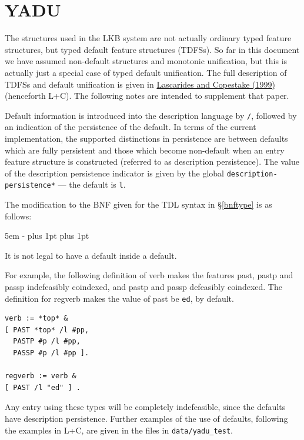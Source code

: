 \documentclass[12pt]{report}
\newcommand{\filename}[1]{{\tt #1}}
\newcommand{\lkbparam}[1]{{\tt #1}}
\begin{document}
\section{YADU}
\label{defaults}

The structures used in the LKB system are not actually 
ordinary typed feature structures, but typed default feature
structures (TDFSs).  So far in this document we have assumed
non-default structures and monotonic unification, but this is actually
just a special case of typed default unification.
The full description of TDFSs and
default unification is
given in 
\href{http://www-csli.stanford.edu/~aac/papers/yadu5-0.ps.gz}{Lascarides and
Copestake (1999)} (henceforth L+C).
The following notes are intended to supplement that paper.

Default information is introduced into the description
language by {\tt /}, followed by an indication of the persistence
of the default.  In terms of the current implementation,
the supported distinctions in persistence are between defaults
which are fully persistent and those which become non-default
when an entry feature structure is constructed (referred to as description
persistence).  The value of the
description persistence indicator is given by the global
\lkbparam{*description-persistence*} --- the default is {\tt l}.

The modification to the BNF given for the TDL
syntax in \S\ref{bnftype} is as follows:
\begin{list}{}
   {\leftmargin 5em
    \itemindent -\leftmargin
    \itemsep 0pt plus 1pt
    \parsep 0pt plus 1pt}
\end{list}
It is not legal to have a default inside a default.

For example, the following definition of {\type verb} makes
the features {\feature past}, {\feature pastp} and {\feature passp} indefeasibly
coindexed, and {\feature pastp} and {\feature passp} defeasibly coindexed.
The definition for {\type regverb} makes the value of {\feature past} be
{\tt ed}, by default.
\begin{verbatim}
verb := *top* &
[ PAST *top* /l #pp,
  PASTP #p /l #pp,
  PASSP #p /l #pp ].

regverb := verb &
[ PAST /l "ed" ] .
\end{verbatim}
Any entry using these types will be completely indefeasible,
since the defaults have description persistence.
Further examples of the use of defaults, following the examples in
L+C, are given in the files in \filename{data/yadu\_test}.
\end{document}
